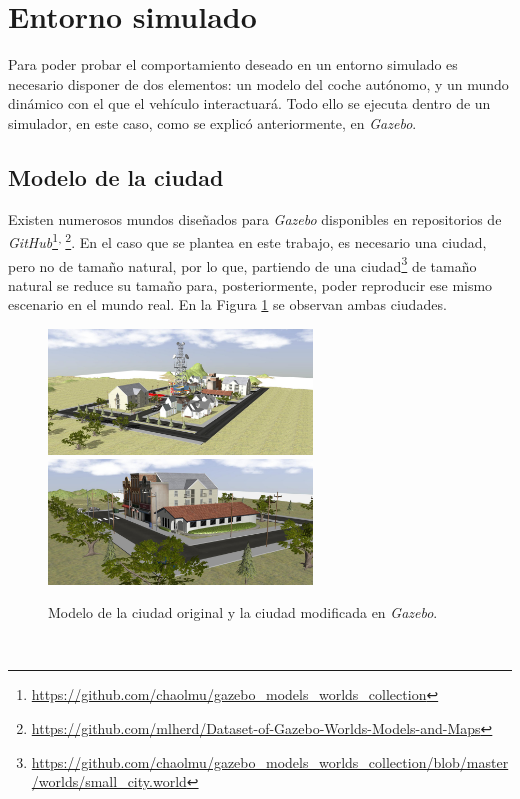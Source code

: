 \section{Entorno simulado}
\label{section:simulation}
Para poder probar el comportamiento deseado en un entorno simulado es necesario disponer de dos elementos: un modelo del coche autónomo, y un mundo dinámico con el que el vehículo interactuará. Todo ello se ejecuta dentro de un simulador, en este caso, como se explicó anteriormente, en \textit{Gazebo}.\\

\subsection{Modelo de la ciudad}
\label{subsection:citymodel}
Existen numerosos mundos diseñados para \textit{Gazebo} disponibles en repositorios de \textit{GitHub}\footnote{\url{https://github.com/chaolmu/gazebo_models_worlds_collection}}$^{,\thinspace}$\footnote{\url{https://github.com/mlherd/Dataset-of-Gazebo-Worlds-Models-and-Maps}}. En el caso que se plantea en este trabajo, es necesario una ciudad, pero no de tamaño natural, por lo que, partiendo de una ciudad\footnote{\url{https://github.com/chaolmu/gazebo_models_worlds_collection/blob/master/worlds/small_city.world}} de tamaño natural se reduce su tamaño para, posteriormente, poder reproducir ese mismo escenario en el mundo real. En la Figura \ref{fig:cityversus} se observan ambas ciudades.\\

\begin{figure} [h!]
	\begin{center}
		\includegraphics[width=7cm]{figs/city2}\hspace{1cm}\includegraphics[width=7cm]{figs/smallcity}
	\end{center}
	\caption{Modelo de la ciudad original y la ciudad modificada en \textit{Gazebo}.}
	\label{fig:cityversus}
\end{figure}\

